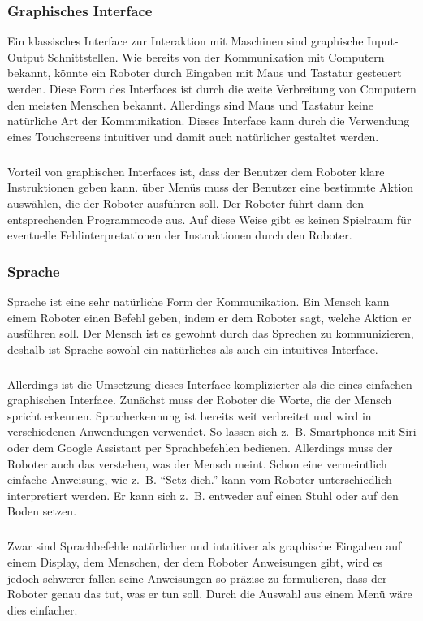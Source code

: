 \subsubsection{Graphisches Interface}
Ein klassisches Interface zur Interaktion mit Maschinen sind graphische
Input-Output Schnittstellen. Wie bereits von der Kommunikation mit Computern
bekannt, könnte ein Roboter durch Eingaben mit Maus und Tastatur gesteuert
werden. Diese Form des Interfaces ist durch die weite Verbreitung von Computern
den meisten Menschen bekannt. Allerdings sind Maus und Tastatur keine
natürliche Art der Kommunikation. Dieses Interface kann durch die Verwendung
eines Touchscreens intuitiver und damit auch natürlicher gestaltet werden.

\subparagraph{}
Vorteil von graphischen Interfaces ist, dass der Benutzer dem Roboter klare
Instruktionen geben kann. über Menüs muss der Benutzer eine bestimmte Aktion
auswählen, die der Roboter ausführen soll. Der Roboter führt dann den
entsprechenden Programmcode aus. Auf diese Weise gibt es keinen Spielraum für
eventuelle Fehlinterpretationen der Instruktionen durch den Roboter.

\subsubsection{Sprache}
Sprache ist eine sehr natürliche Form der Kommunikation. Ein Mensch kann einem
Roboter einen Befehl geben, indem er dem Roboter sagt, welche Aktion er
ausführen soll. Der Mensch ist es gewohnt durch das Sprechen zu kommunizieren,
deshalb ist Sprache sowohl ein natürliches als auch ein intuitives Interface.

\subparagraph{}
Allerdings ist die Umsetzung dieses Interface komplizierter als die eines
einfachen graphischen Interface. Zunächst muss der Roboter die Worte, die der
Mensch spricht erkennen. Spracherkennung ist bereits weit verbreitet und wird in
verschiedenen Anwendungen verwendet. So lassen sich z.~B. Smartphones mit Siri
oder dem Google Assistant per Sprachbefehlen bedienen. Allerdings muss der
Roboter auch das verstehen, was der Mensch meint. Schon eine vermeintlich
einfache Anweisung, wie z.~B. "`Setz dich."' kann vom Roboter unterschiedlich
interpretiert werden. Er kann sich z.~B. entweder auf einen Stuhl oder auf den
Boden setzen.

\subparagraph{}
Zwar sind Sprachbefehle natürlicher und intuitiver als graphische Eingaben auf
einem Display, dem Menschen, der dem Roboter Anweisungen gibt, wird es jedoch
schwerer fallen seine Anweisungen so präzise zu formulieren, dass der Roboter
genau das tut, was er tun soll. Durch die Auswahl aus einem Menü wäre dies
einfacher.

